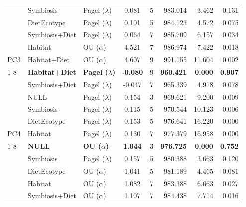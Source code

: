 \begin{table}[!h]
\begin{tabular}[t]{lllccrrr}
 & Symbiosis & Pagel ($\lambda$) & 0.081 & 5 & 983.014 & 3.462 & 0.131\\

 & DietEcotype & Pagel ($\lambda$) & 0.101 & 5 & 984.123 & 4.572 & 0.075\\

 & Symbiosis+Diet & Pagel ($\lambda$) & 0.064 & 7 & 985.709 & 6.157 & 0.034\\

 & Habitat & OU ($\alpha$) & 4.521 & 7 & 986.974 & 7.422 & 0.018\\

\multirow{-6}{*}{\raggedright\arraybackslash PC3} & Habitat+Diet & OU ($\alpha$) & 4.607 & 9 & 991.155 & 11.604 & 0.002\\
\cmidrule{1-8}
 & \textbf{Habitat+Diet} & \textbf{Pagel ($\lambda$)} & \textbf{-0.080} & 9 & \textbf{960.421} & \textbf{0.000} & \textbf{0.907}\\

 & Symbiosis+Diet & Pagel ($\lambda$) & -0.047 & 7 & 965.339 & 4.918 & 0.078\\

 & NULL & Pagel ($\lambda$) & 0.154 & 3 & 969.621 & 9.200 & 0.009\\

 & Symbiosis & Pagel ($\lambda$) & 0.115 & 5 & 970.544 & 10.123 & 0.006\\

 & DietEcotype & Pagel ($\lambda$) & 0.153 & 5 & 976.641 & 16.220 & 0.000\\

\multirow{-6}{*}{\raggedright\arraybackslash PC4} & Habitat & Pagel ($\lambda$) & 0.130 & 7 & 977.379 & 16.958 & 0.000\\
\cmidrule{1-8}
 & \textbf{NULL} & \textbf{OU ($\alpha$)} & \textbf{1.044} & 3 & \textbf{976.725} & \textbf{0.000} & \textbf{0.752}\\

 & Symbiosis & Pagel ($\lambda$) & 0.157 & 5 & 980.388 & 3.663 & 0.120\\

 & DietEcotype & OU ($\alpha$) & 1.041 & 5 & 981.189 & 4.465 & 0.081\\

 & Habitat & OU ($\alpha$) & 1.082 & 7 & 983.388 & 6.663 & 0.027\\

 & Symbiosis+Diet & OU ($\alpha$) & 1.107 & 7 & 984.438 & 7.714 & 0.016\\


\end{tabular}
\end{table}
